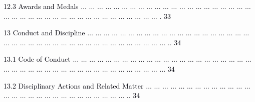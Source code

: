 \documentclass[12pt]{article}
\begin{document}
\vspace{\baselineskip}
\begin{adjustwidth}{0.21in}{0.0in}
{\fontsize{7pt}{8.4pt}\selectfont \textcolor[HTML]{00000A}{12.3 Awards and Medals $ \ldots $ $ \ldots $ $ \ldots $ $ \ldots $ $ \ldots $ $ \ldots $ $ \ldots $ $ \ldots $ $ \ldots $ $ \ldots $ $ \ldots $ $ \ldots $ $ \ldots $ $ \ldots $ $ \ldots $ $ \ldots $ $ \ldots $ $ \ldots $ $ \ldots $ $ \ldots $ $ \ldots $ $ \ldots $ $ \ldots $ $ \ldots $ $ \ldots $ $ \ldots $ $ \ldots $ $ \ldots $ $ \ldots $ $ \ldots $ $ \ldots $ $ \ldots $ $ \ldots $ $ \ldots $ $ \ldots $ $ \ldots $ $ \ldots $ $ \ldots $ $ \ldots $ $ \ldots $ . 33}\par}\par

\end{adjustwidth}


\vspace{\baselineskip}
{\fontsize{7pt}{8.4pt}\selectfont \textcolor[HTML]{00000A}{13 Conduct and Discipline $ \ldots $ $ \ldots $ $ \ldots $ $ \ldots $ $ \ldots $ $ \ldots $ $ \ldots $ $ \ldots $ $ \ldots $ $ \ldots $ $ \ldots $ $ \ldots $ $ \ldots $ $ \ldots $ $ \ldots $ $ \ldots $ $ \ldots $ $ \ldots $ $ \ldots $ $ \ldots $ $ \ldots $ $ \ldots $ $ \ldots $ $ \ldots $ $ \ldots $ $ \ldots $ $ \ldots $ $ \ldots $ $ \ldots $ $ \ldots $ $ \ldots $ $ \ldots $ $ \ldots $ $ \ldots $ $ \ldots $ $ \ldots $ $ \ldots $ $ \ldots $ $ \ldots $ $ \ldots $ .. 34}\par}\par


\vspace{\baselineskip}
\begin{adjustwidth}{0.21in}{0.0in}
{\fontsize{7pt}{8.4pt}\selectfont \textcolor[HTML]{00000A}{13.1 Code of Conduct $ \ldots $ $ \ldots $ $ \ldots $ $ \ldots $ $ \ldots $ $ \ldots $ $ \ldots $ $ \ldots $ $ \ldots $ $ \ldots $ $ \ldots $ $ \ldots $ $ \ldots $ $ \ldots $ $ \ldots $ $ \ldots $ $ \ldots $ $ \ldots $ $ \ldots $ $ \ldots $ $ \ldots $ $ \ldots $ $ \ldots $ $ \ldots $ $ \ldots $ $ \ldots $ $ \ldots $ $ \ldots $ $ \ldots $ $ \ldots $ $ \ldots $ $ \ldots $ $ \ldots $ $ \ldots $ $ \ldots $ $ \ldots $ $ \ldots $ $ \ldots $ $ \ldots $ $ \ldots $ $ \ldots $ $ \ldots $  34}\par}\par

\end{adjustwidth}


\vspace{\baselineskip}
\begin{adjustwidth}{0.21in}{0.0in}
{\fontsize{7pt}{8.4pt}\selectfont \textcolor[HTML]{00000A}{13.2 Disciplinary Actions and Related Matter $ \ldots $ $ \ldots $ $ \ldots $ $ \ldots $ $ \ldots $ $ \ldots $ $ \ldots $ $ \ldots $ $ \ldots $ $ \ldots $ $ \ldots $ $ \ldots $ $ \ldots $ $ \ldots $ $ \ldots $ $ \ldots $ $ \ldots $ $ \ldots $ $ \ldots $ $ \ldots $ $ \ldots $ $ \ldots $ $ \ldots $ $ \ldots $ $ \ldots $ $ \ldots $ $ \ldots $ $ \ldots $ .. 34}\par}\par

\end{adjustwidth}
\end{document}

